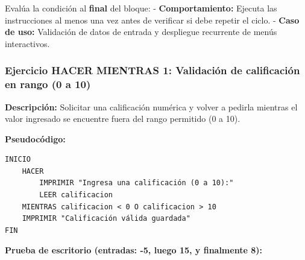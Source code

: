 Evalúa la condición al \textbf{final} del bloque: -
\textbf{Comportamiento:} Ejecuta las instrucciones al menos una vez
antes de verificar si debe repetir el ciclo. - \textbf{Caso de uso:}
Validación de datos de entrada y despliegue recurrente de menús
interactivos.

\subsubsection{Ejercicio HACER MIENTRAS 1: Validación de calificación en
rango (0 a
10)}\label{ejercicio-hacer-mientras-1-validaciuxf3n-de-calificaciuxf3n-en-rango-0-a-10}

\textbf{Descripción:} Solicitar una calificación numérica y volver a
pedirla mientras el valor ingresado se encuentre fuera del rango
permitido (0 a 10).

\textbf{Pseudocódigo:}

\begin{verbatim}
INICIO
    HACER
        IMPRIMIR "Ingresa una calificación (0 a 10):"
        LEER calificacion
    MIENTRAS calificacion < 0 O calificacion > 10
    IMPRIMIR "Calificación válida guardada"
FIN
\end{verbatim}



\textbf{Prueba de escritorio (entradas: -5, luego 15, y finalmente 8):}

